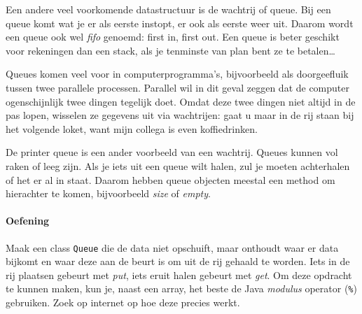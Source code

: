 \documentclass[a4paper,10pt]{article}
\newcommand{\code}[1]{\texttt{#1}}
\begin{document}
Een andere veel voorkomende datastructuur is de wachtrij of queue.
Bij een queue komt wat je er als eerste instopt, er ook als eerste weer uit.
Daarom wordt een queue ook wel \emph{fifo} genoemd: first in, first out.
Een queue is beter geschikt voor rekeningen dan een stack, als je tenminste van plan bent ze te betalen\dots

Queues komen veel voor in computerprogramma's, bijvoorbeeld als doorgeefluik tussen twee parallele processen.
Parallel wil in dit geval zeggen dat de computer ogenschijnlijk twee dingen tegelijk doet.
Omdat deze twee dingen niet altijd in de pas lopen, wisselen ze gegevens uit via wachtrijen:
gaat u maar in de rij staan bij het volgende loket, want mijn collega is even koffiedrinken.

De printer queue is een ander voorbeeld van een wachtrij.
Queues kunnen vol raken of leeg zijn.
Als je iets uit een queue wilt halen, zul je moeten achterhalen of het er al in staat.
Daarom hebben queue objecten meestal een method om hierachter te komen, bijvoorbeeld \emph{size} of \emph{empty}.

\hspace{-3pt}

\paragraph{Oefening}

Maak een class \code{Queue} die de data niet opschuift, maar onthoudt waar er data bijkomt en waar deze aan de beurt is om uit de rij gehaald te worden.
Iets in de rij plaatsen gebeurt met \emph{put}, iets eruit halen gebeurt met \emph{get}.
Om deze opdracht te kunnen maken, kun je, naast een array, het beste de Java \emph{modulus} operator (\code{\%}) gebruiken.
Zoek op internet op hoe deze precies werkt.
\end{document}
